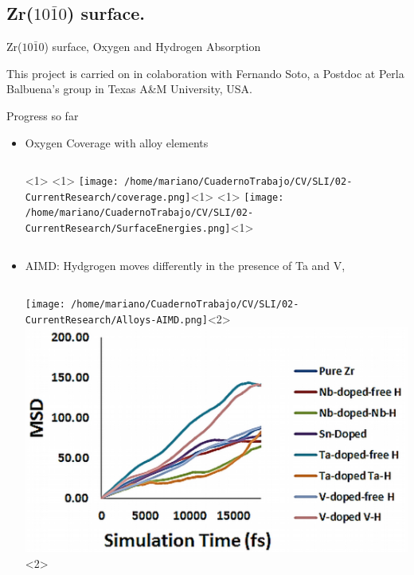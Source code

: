 \subsection{ Zr($10\bar{1}0$) surface.}
\begin{frame}{ Zr($10\bar{1}0$) surface, Oxygen and Hydrogen Absorption}

\begingroup
\small
  This project is carried on in colaboration with Fernando Soto, a Postdoc at 
  Perla Balbuena's group in Texas A\&M University, USA. 
\endgroup
  \begin{block}{Progress so far}
  \begin{itemize}
      \item<1-> Oxygen Coverage with alloy elements
	\begin{columns}
	\vspace{1cm}
	  \texttt{[image: /home/mariano/CuadernoTrabajo/CV/SLI/02-CurrentResearch/coverage.png]}<1>
	\vspace{1cm}
	  \texttt{[image: /home/mariano/CuadernoTrabajo/CV/SLI/02-CurrentResearch/SurfaceEnergies.png]}<1>

	\end{columns}
      \item<2> AIMD: Hydgrogen moves differently in the presence of Ta and V,

	\begin{columns}
	  \texttt{[image: /home/mariano/CuadernoTrabajo/CV/SLI/02-CurrentResearch/Alloys-AIMD.png]}<2>
	\includegraphics[width=\textwidth]{./02-CurrentResearch/HydrogenMeanFreePaths.png}<2>
	\end{columns}
  \end{itemize}
  \end{block}

\end{frame}

